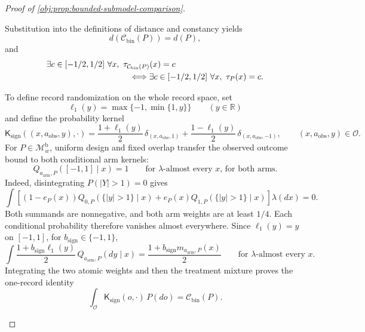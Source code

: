 \documentclass[11pt]{article}
\begin{document}
\begin{proof}[Proof of \cref{obj:prop:bounded-submodel-comparison}]
\begin{enumerate}
\[\]
Substitution into the definitions of distance and constancy yields
\[
d(\mathcal C_{\mathrm{bin}}(P))=d(P),
\]
and
\[
\begin{split}
&\exists c\in[-1/2,1/2]\ 
  \forall x,\ \tau_{\mathcal C_{\mathrm{bin}}(P)}(x)=c\\
&\hspace{35mm}\Longleftrightarrow
\exists c\in[-1/2,1/2]\ 
  \forall x,\ \tau_P(x)=c.
\end{split}
\]

To define record randomization on the whole record space, set
\[
\ell_1(y)=\max\{-1,\min\{1,y\}\}\qquad(y\in\mathbb R)
\]
and define the probability kernel
\[
\mathsf K_{\mathrm{sign}}((x,a_{\mathrm{obs}},y),\cdot)
=
\frac{1+\ell_1(y)}2\,\delta_{(x,a_{\mathrm{obs}},1)}
+\frac{1-\ell_1(y)}2\,\delta_{(x,a_{\mathrm{obs}},-1)},
\qquad (x,a_{\mathrm{obs}},y)\in\mathcal O.
\]
For \(P\in\mathcal M_w^{\mathrm b}\), uniform design and fixed overlap transfer the observed outcome bound to both conditional arm kernels:
\[
Q_{a_{\mathrm{arm}},P}([-1,1]\mid x)=1
\qquad
\text{for \(\lambda\)-almost every \(x\), for both arms}.
\]
Indeed, disintegrating \(P(|Y|>1)=0\) gives
\[
\int
\left[
(1-e_P(x))Q_{0,P}(\{|y|>1\}\mid x)
+e_P(x)Q_{1,P}(\{|y|>1\}\mid x)
\right]\lambda(dx)=0.
\]
Both summands are nonnegative, and both arm weights are at least \(1/4\). Each conditional probability therefore vanishes almost everywhere. Since \(\ell_1(y)=y\) on \([-1,1]\), for \(b_{\mathrm{sign}}\in\{-1,1\}\),
\[
\int
\frac{1+b_{\mathrm{sign}}\ell_1(y)}2\,
Q_{a_{\mathrm{arm}},P}(dy\mid x)
=
\frac{1+b_{\mathrm{sign}}m_{a_{\mathrm{arm}},P}(x)}2
\qquad\text{for \(\lambda\)-almost every \(x\)}.
\]
Integrating the two atomic weights and then the treatment mixture proves the one-record identity
\[
\int_{\mathcal O}\mathsf K_{\mathrm{sign}}(o,\cdot)\,P(do)
=\mathcal C_{\mathrm{bin}}(P).
\]


\end{enumerate}
\end{proof}
\end{document}
